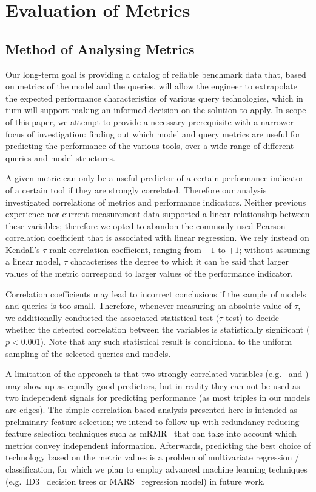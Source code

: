 \section{Evaluation of Metrics}
\label{sec:eval}

\subsection{Method of Analysing Metrics}
Our long-term goal is providing a catalog of reliable benchmark data that,
based on metrics of the model and the queries, will allow the engineer to
extrapolate the expected performance characteristics of various query
technologies, which in turn will support making an informed decision on the
solution to apply. In scope of this paper, we attempt to provide a necessary
prerequisite with a narrower focus of investigation: finding out which model and
query metrics are useful for predicting the performance 
of the various tools, over a wide range of different queries and model
structures.

A given metric can only be a useful predictor of a certain performance indicator
of a certain tool if they are strongly correlated. Therefore our analysis
investigated correlations of metrics and performance indicators. Neither
previous experience nor current measurement data supported a linear relationship
between these variables; therefore we opted to abandon the commonly used Pearson
correlation coefficient that is associated with linear regression. We rely
instead on Kendall's $\tau$ %
 rank correlation coefficient, ranging from $-1$ to $+1$; without assuming a
 linear model, $\tau$ characterises the degree to which it can be said that
 larger values of the metric correspond to larger values of the performance
 indicator.

Correlation coefficients may lead to incorrect conclusions if the sample of
models and queries is too small. Therefore, whenever measuring an absolute value
of $\tau$, we additionally conducted the associated statistical test
($\tau$-test) to decide whether the detected correlation between the variables
is statistically significant ($p < 0.001$). Note that any such statistical result
is conditional to the uniform sampling of the selected queries and models.


A limitation of the approach is that two strongly correlated variables (e.g.\ 
 and ) may show up as equally good
predictors, but in reality they can not be used as two independent signals for
predicting performance (as most triples in our models are edges). The simple
correlation-based analysis presented here is intended as preliminary feature
selection; we intend to follow up with redundancy-reducing feature selection
techniques such as mRMR~\cite{mRMR-1453511} that can take into account which
metrics convey independent information. Afterwards, predicting the best choice
of technology based on the metric values is a problem of multivariate regression
/ classification, for which we plan to employ advanced machine learning
techniques (e.g.\ ID3~\cite{ID3-quinlan-1986} decision trees or
MARS~\cite{MARS-MR1091842} regression model) in future work.

